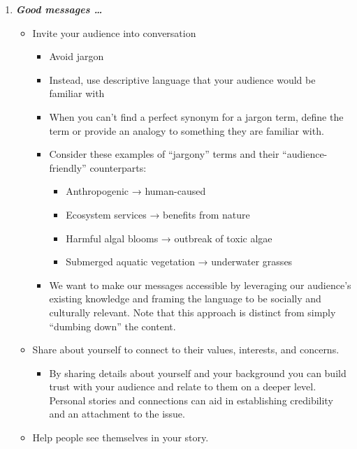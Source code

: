 \documentclass[
]{book}
\providecommand{\tightlist}{%
  \setlength{\itemsep}{0pt}\setlength{\parskip}{0pt}}
\begin{document}
\begin{enumerate}
\def\labelenumi{\arabic{enumi}.}
\setcounter{enumi}{1}
\item
  \textbf{\emph{Good messages \ldots{}}}

  \begin{itemize}
  \item
    Invite your audience into conversation

    \begin{itemize}
    \tightlist
    \item
      Avoid jargon
    \item
      Instead, use descriptive language that your audience would be familiar with
    \item
      When you can't find a perfect synonym for a jargon term, define the term or provide an analogy to something they are familiar with.
    \item
      Consider these examples of ``jargony'' terms and their ``audience-friendly'' counterparts:

      \begin{itemize}
      \tightlist
      \item
        Anthropogenic → human-caused
      \item
        Ecosystem services → benefits from nature
      \item
        Harmful algal blooms → outbreak of toxic algae
      \item
        Submerged aquatic vegetation → underwater grasses
      \end{itemize}
    \item
      We want to make our messages accessible by leveraging our audience's existing knowledge and framing the language to be socially and culturally relevant. Note that this approach is distinct from simply ``dumbing down'' the content.
    \end{itemize}
  \item
    Share about yourself to connect to their values, interests, and concerns.

    \begin{itemize}
    \tightlist
    \item
      By sharing details about yourself and your background you can build trust with your audience and relate to them on a deeper level. Personal stories and connections can aid in establishing credibility and an attachment to the issue.
    \end{itemize}
  \item
    Help people see themselves in your story.


\end{itemize}
\end{enumerate}
\end{document}
